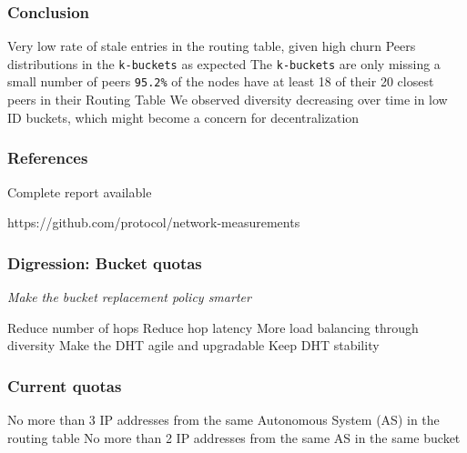 \documentclass{pl-slide}
\begin{document}
\begin{frame}
\frametitle{Conclusion}
\begin{itemize}
	\itemc Very low rate of stale entries in the routing table, given high churn
	\itemc Peers distributions in the \texttt{k-buckets} as expected
	\itemc The \texttt{k-buckets} are only missing a small number of peers
	\itemc \texttt{95.2\%} of the nodes have at least 18 of their 20 closest peers in their Routing Table
	\itemc We observed diversity decreasing over time in low ID buckets, which might become a concern for decentralization
	\bigskip
\end{itemize}
\end{frame}

\begin{frame}
\frametitle{References}
\begin{center}
Complete report available
\medskip


\medskip
https://github.com/protocol/network-measurements
\end{center}
\end{frame}

\begin{frame}
\frametitle{Digression: Bucket quotas}
\begin{center}
	{\large\greencube \hspace{1em} \textit{Make the bucket replacement policy smarter} \hspace{1em}\greencube}
\end{center}
\bigskip
\begin{itemize}
	\itemc Reduce number of hops
	\itemc Reduce hop latency
	\itemc More load balancing through diversity
	\itemc Make the DHT agile and upgradable
	\itemc Keep DHT stability
\end{itemize}
\end{frame}

\begin{frame}
\frametitle{Current quotas}
\begin{itemize}
	\itemc No more than 3 IP addresses from the same Autonomous System (AS) in the routing table
	\itemc No more than 2 IP addresses from the same AS in the same bucket
\end{itemize}
\end{frame}
\end{document}

